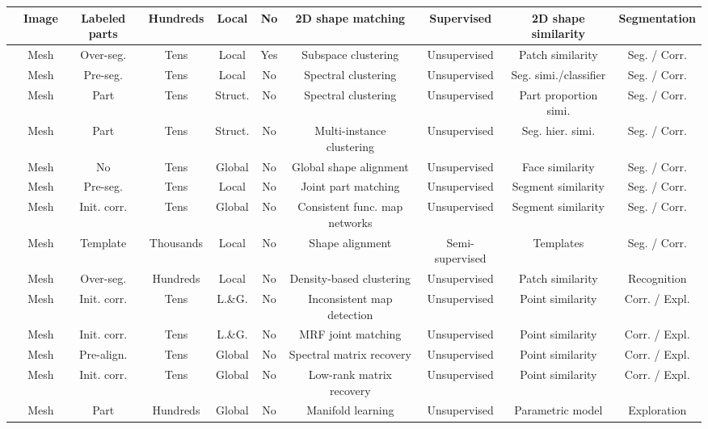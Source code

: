 \begin{table*}[t!]
\begin{tabular*}{\textwidth}{l|c|c|c|c|c|c|c|c|c}
    \cite{Wang:2013:PAS} &Image	&Labeled parts	&Hundreds	&Local	&No	&2D shape matching	&Supervised	&2D shape similarity	&Segmentation \\ \hline
    \cite{Hu:2012:CSS}	&Mesh	&Over-seg.	&Tens	&Local	&Yes	&Subspace clustering	&Unsupervised	&Patch similarity	&Seg. / Corr. \\ \hline
    \cite{Sidi:2011:CS}	&Mesh	&Pre-seg.	&Tens	&Local	&No	&Spectral clustering	&Unsupervised	&Seg. simi./classifier	&Seg. / Corr. \\ \hline
    \cite{Xu:2010:SCS}	&Mesh	&Part	&Tens	&Struct.	&No	&Spectral clustering	&Unsupervised	&Part proportion simi.	&Seg. / Corr. \\ \hline
    \cite{van-Kaick:2013:CHA}	&Mesh	&Part	&Tens	&Struct.	&No	&Multi-instance clustering	&Unsupervised	&Seg. hier. simi.	&Seg. / Corr. \\ \hline
    \cite{Golovinskiy:2009:CS}	&Mesh	&No	&Tens	&Global	&No	&Global shape alignment	&Unsupervised	&Face similarity	&Seg. / Corr. \\ \hline
    \cite{Huang:2011:JSS}	&Mesh	&Pre-seg.	&Tens	&Local	&No	&Joint part matching	&Unsupervised	&Segment similarity	&Seg. / Corr. \\ \hline
    \cite{Huang:2014:FMN}	&Mesh	&Init. corr.	&Tens	&Global	&No	&Consistent func. map networks	&Unsupervised	&Segment similarity	&Seg. / Corr. \\ \hline
    \cite{Kim:2013:lpt}	&Mesh	&Template	&Thousands	&Local	&No	&Shape alignment	&Semi-supervised	&Templates	&Seg. / Corr. \\ \hline
    \cite{MATTAUSCH:2014:ODC}	&Mesh	&Over-seg.	&Hundreds	&Local	&No	&Density-based clustering	&Unsupervised	&Patch similarity	&Recognition \\ \hline
    \cite{Nguyen:2011:CSM}   &Mesh	&Init. corr.	&Tens	&L.\&G.	&No	&Inconsistent map detection	&Unsupervised	&Point similarity	&Corr. / Expl. \\ \hline
    \cite{Huang:2012:OAE}	&Mesh	&Init. corr.	&Tens	&L.\&G.	&No	&MRF joint matching	&Unsupervised	&Point similarity	&Corr. / Expl. \\ \hline
    \cite{Kim:2012:FC}	&Mesh	&Pre-align.	&Tens	&Global	&No	&Spectral matrix recovery	&Unsupervised	&Point similarity	&Corr. / Expl. \\ \hline
    \cite{Huang:2013:SDP}	&Mesh	&Init. corr.	&Tens	&Global	&No	&Low-rank matrix recovery	&Unsupervised	&Point similarity	&Corr. / Expl. \\ \hline
    \cite{Ovsjanikov:2011:ECV}	&Mesh	&Part	&Hundreds	&Global	&No	&Manifold learning	&Unsupervised	&Parametric model	&Exploration \\ \hline

\end{tabular*}
\end{table*}

